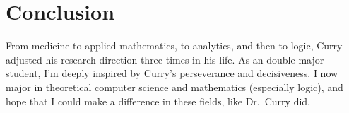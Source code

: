 \section{Conclusion}
From medicine to applied mathematics, to analytics, and then to logic, 
Curry adjusted his research direction three times in his life. 
As an double-major student, I'm deeply inspired by Curry's perseverance and decisiveness. 
I now major in theoretical computer science and mathematics (especially logic), 
and hope that I could make a difference in these fields, like Dr.~Curry did.
